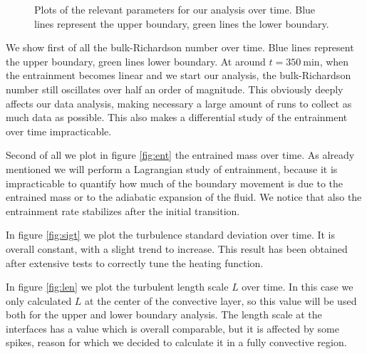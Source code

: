 \begin{figure}[t!]
  \centering
      \hfill
	\hfill
  \centering
      \hfill
	\hfill
  \centering
      \hfill
	\caption{Plots of the relevant parameters for our analysis over time. Blue lines represent the upper boundary, green lines the lower boundary.}
	  \label{fig:2dsingle}
  \end{figure}
We show first of all the bulk-Richardson number over time. Blue lines represent the upper boundary, green lines lower boundary. At around $t=\mathrm{350 \ min}$, when the entrainment becomes linear and we start our analysis, the bulk-Richardson number still oscillates over half an order of magnitude. This obviously deeply affects our data analysis, making necessary a large amount of runs to collect as much data as possible. This also makes a differential study of the entrainment over time impracticable. 

Second of all we plot in figure \ref{fig:ent} the entrained mass over time. As already mentioned we will perform a Lagrangian study of entrainment, because it is impracticable to quantify how much of the boundary movement is due to the entrained mass or to the adiabatic expansion of the fluid. We notice that also the entrainment rate stabilizes after the initial transition. 

  In figure \ref{fig:sigt} we plot the turbulence standard deviation over time. It is overall constant, with a slight trend to increase. This result has been obtained after extensive tests to correctly tune the heating function.

  In figure \ref{fig:len} we plot the turbulent length scale $L$ over time. In this case we only calculated $L$ at the center of the convective layer, so this value will be used both for the upper and lower boundary analysis. The length scale at the interfaces has a value which is overall comparable, but it is affected by some spikes, reason for which we decided to calculate it in a fully convective region.

